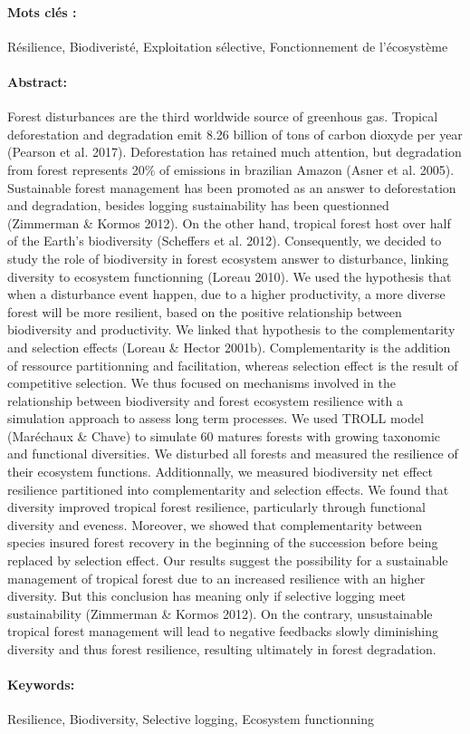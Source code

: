 \documentclass[12pt,]{article}
\theoremstyle{definition}
\theoremstyle{definition}
\theoremstyle{remark}
\begin{document}
{  \paragraph{Mots clés :} Résilience, Biodiveristé, Exploitation sélective, Fonctionnement de l'écosystème
  \paragraph{Abstract:}
  Forest disturbances are the third worldwide source of greenhous gas. Tropical deforestation and degradation emit 8.26 billion of tons of carbon dioxyde per year (Pearson et al. 2017). Deforestation has retained much attention, but degradation from forest represents 20\% of emissions in brazilian Amazon (Asner et al. 2005). Sustainable forest management has been promoted as an answer to deforestation and degradation, besides logging sustainability has been questionned (Zimmerman \& Kormos 2012). On the other hand, tropical forest host over half of the Earth’s biodiversity (Scheffers et al. 2012). Consequently, we decided to study the role of biodiversity in forest ecosystem answer to disturbance, linking diversity to ecosystem functionning (Loreau 2010). We used the hypothesis that when a disturbance event happen, due to a higher productivity, a more diverse forest will be more resilient, based on the positive relationship between biodiversity and productivity. We linked that hypothesis to the complementarity and selection effects (Loreau \& Hector 2001b). Complementarity is the addition of ressource partitionning and facilitation, whereas selection effect is the result of competitive selection. We thus focused on mechanisms involved in the relationship between biodiversity and forest ecosystem resilience with a simulation approach to assess long term processes. We used TROLL model (Maréchaux \& Chave) to simulate 60 matures forests with growing taxonomic and functional diversities. We disturbed all forests and measured the resilience of their ecosystem functions. Additionnally, we measured biodiversity net effect resilience partitioned into complementarity and selection effects. We found that diversity improved tropical forest resilience, particularly through functional diversity and eveness. Moreover, we showed that complementarity between species insured forest recovery in the beginning of the succession before being replaced by selection effect. Our results suggest the possibility for a sustainable management of tropical forest due to an increased resilience with an higher diversity. But this conclusion has meaning only if selective logging meet sustainability (Zimmerman \& Kormos 2012). On the contrary, unsustainable tropical forest management will lead to negative feedbacks slowly diminishing diversity and thus forest resilience, resulting ultimately in forest degradation.
  \paragraph{Keywords:}Resilience, Biodiversity, Selective logging, Ecosystem functionning
  }
  
\end{document}
